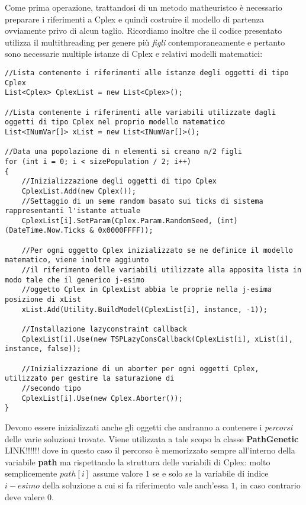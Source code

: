 \documentclass[11pt]{article}
\begin{document}
Come prima operazione, trattandosi di un metodo matheuristco è necessario preparare i riferimenti a Cplex e quindi costruire il modello di partenza ovviamente privo di alcun taglio. Ricordiamo inoltre che il codice presentato utilizza il multithreading per genere più \textit{figli} contemporaneamente e pertanto sono necessarie multiple istanze di Cplex e relativi modelli matematici:

\begin{lstlisting}
//Lista contenente i riferimenti alle istanze degli oggetti di tipo Cplex
List<Cplex> CplexList = new List<Cplex>();

//Lista contenente i riferimenti alle variabili utilizzate dagli oggetti di tipo Cplex nel proprio modello matematico
List<INumVar[]> xList = new List<INumVar[]>();

//Data una popolazione di n elementi si creano n/2 figli 
for (int i = 0; i < sizePopulation / 2; i++)
{
    //Inizializzazione degli oggetti di tipo Cplex
    CplexList.Add(new Cplex());
    //Settaggio di un seme random basato sui ticks di sistema rappresentanti l'istante attuale
    CplexList[i].SetParam(Cplex.Param.RandomSeed, (int)(DateTime.Now.Ticks & 0x0000FFFF));

    //Per ogni oggetto Cplex inizializzato se ne definice il modello matematico, viene inoltre aggiunto 
    //il riferimento delle variabili utilizzate alla apposita lista in modo tale che il generico j-esimo
    //oggetto Cplex in CplexList abbia le proprie nella j-esima posizione di xList
    xList.Add(Utility.BuildModel(CplexList[i], instance, -1));

    //Installazione lazyconstraint callback
    CplexList[i].Use(new TSPLazyConsCallback(CplexList[i], xList[i], instance, false));

    //Inizializzazione di un aborter per ogni oggetti Cplex, utilizzato per gestire la saturazione di 
    //secondo tipo
    CplexList[i].Use(new Cplex.Aborter());
}
\end{lstlisting}

Devono essere inizializzati anche gli oggetti che andranno a contenere i \textit{percorsi} delle varie soluzioni trovate. Viene utilizzata a tale scopo la classe \textbf{PathGenetic} LINK!!!!!! dove in questo caso il percorso è memorizzato sempre all'interno della variabile \textbf{path} ma rispettando la struttura delle variabili di Cplex: molto semplicemente $path[i]$ assume valore $1$ se e solo se la variabile di indice $i-esimo$ della soluzione a cui si fa riferimento vale anch'essa $1$, in caso contrario deve valere $0$.
\end{document}

